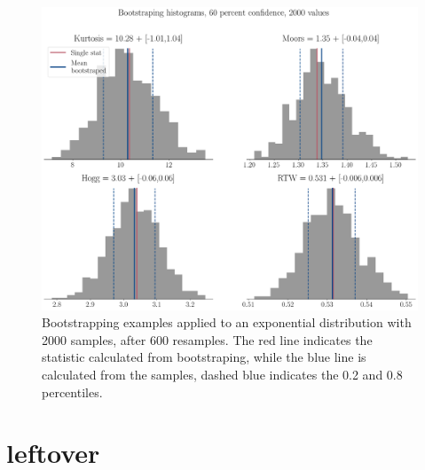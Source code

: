 \begin{figure}[htb]
	\centering
	\includegraphics[width=\linewidth]{Images/Metrics/boot_histograms_exponential}
	\caption{ Bootstrapping examples applied to an exponential distribution with 2000 samples, after 600 resamples. The red line indicates the statistic calculated from bootstraping, while the blue line is calculated from the samples, dashed blue indicates the 0.2 and 0.8 percentiles.}
	\label{fig:boothistogramsexponential}
\end{figure}



\section{leftover}

